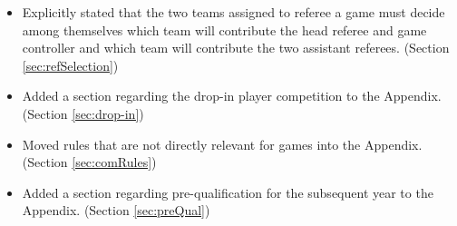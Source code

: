 \documentclass[12pt]{article}
\begin{document}
\begin{itemize}
	\item Explicitly stated that the two teams assigned to referee a game must decide among themselves which team will contribute the head referee and game controller and which team will contribute the two assistant referees. (Section \ref{sec:refSelection})
	\item Added a section regarding the drop-in player competition to the Appendix. (Section \ref{sec:drop-in})
	\item Moved rules that are not directly relevant for games into the Appendix. (Section \ref{sec:comRules})
	\item Added a section regarding pre-qualification for the subsequent year to the Appendix. (Section \ref{sec:preQual})
\end{itemize}
\end{document}
